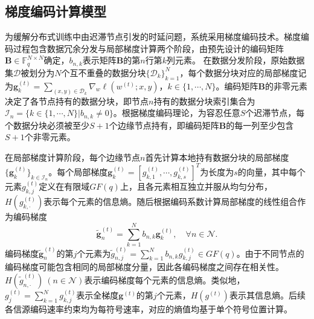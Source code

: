 \subsection{梯度编码计算模型}
为缓解分布式训练中由迟滞节点引发的时延问题，系统采用梯度编码技术。梯度编码过程包含数据冗余分发与局部梯度计算两个阶段，由预先设计的编码矩阵$\mathbf{B}\in\mathbb{F}_q^{N\times N}$确定，$b_{n,k}$表示矩阵$\mathbf{B}$的第$n$行第$k$列元素。
在数据分发阶段，原始数据集$\mathcal{D}$被划分为$N$个互不重叠的数据分块$\{\mathcal{D}_k\}_{k=1}^N$，每个数据分块对应的局部梯度记为$\mathbf{g}_k^{(t)}=\sum_{(x,y)\in\mathcal{D}_k}\nabla_w \ell(w^{(t)};x,y)$，$k\in\{1,\cdots,N\}$。编码矩阵$\mathbf{B}$的非零元素决定了各节点持有的数据分块，即节点$n$持有的数据分块索引集合为$\mathcal{I}_n=\{k\in\{1,\cdots,N\}|b_{n,k}\neq 0\}$。根据梯度编码理论，为容忍任意$S$个迟滞节点，每个数据分块必须被至少$S+1$个边缘节点持有，即编码矩阵$\mathbf{B}$的每一列至少包含$S+1$个非零元素。

	在局部梯度计算阶段，每个边缘节点$n$首先计算本地持有数据分块的局部梯度$\{\mathbf{g}_k^{(t)}\}_{k\in \mathcal{I}_n}$。每个局部梯度$\mathbf{g}_k^{(t)}=[g_{k,1}^{(t)},\cdots,g_{k,s}^{(t)}]^T$为长度为$s$的向量，其中每个元素$g_{k,j}^{(t)}$定义在有限域$GF(q)$上，且各元素相互独立并服从均匀分布，$H(g_{k,\cdot}^{(t)})$表示每个元素的信息熵。随后根据编码系数计算局部梯度的线性组合作为编码梯度
	\begin{equation}
		\tilde{\mathbf{g}}_n^{(t)}=\sum_{k=1}^N b_{n,k}\mathbf{g}_k^{(t)}, \quad \forall n\in\mathcal{N}.
	\end{equation}
	编码梯度$\tilde{\mathbf{g}}_n^{(t)}$的第$j$个元素为$\tilde{g}_{n,j}^{(t)}=\sum_{k=1}^N b_{n,k}g_{k,j}^{(t)}\in GF(q)$。由于不同节点的编码梯度可能包含相同的局部梯度分量，因此各编码梯度之间存在相关性。$H(\tilde{g}_{n,\cdot}^{(t)})~(n\in\mathcal{N})$表示编码梯度每个元素的信息熵。类似地，$g_j^{(t)}=\sum_{k=1}^Ng_{k,j}^{(t)}$表示全梯度$\mathbf{g}^{(t)}$的第$j$个元素，$H(g^{(t)})$表示其信息熵。后续各信源编码速率约束均为每符号速率，对应的熵值均基于单个符号位置计算。

